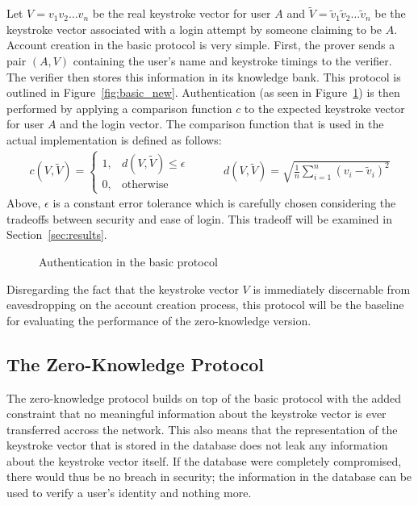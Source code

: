 \documentclass[11pt]{article}
\begin{document}
Let $V=v_1v_2\ldots v_n$ be the real keystroke vector for user $A$ and $\tilde V = \tilde v_1\tilde v_2\ldots\tilde v_n$ be the keystroke vector associated with a login attempt by someone claiming to be $A$. Account creation in the basic protocol is very simple. First, the prover sends a pair $(A,V)$ containing the user's name and keystroke timings to the verifier. The verifier then stores this information in its knowledge bank. This protocol is outlined in Figure~\ref{fig:basic_new}. Authentication (as seen in Figure~\ref{fig:basic_auth}) is then performed by applying a comparison function $c$ to the expected keystroke vector for user $A$ and the login vector. The comparison function that is used in the actual implementation is defined as follows:
$$\begin{array}{ccc}
c(V,\tilde V) = \begin{cases}
  1, & d(V, \tilde V) \le \epsilon \\
  0, & \text{otherwise}
\end{cases}
& \;\;\;\;\; &
d(V,\tilde V) = \sqrt{\frac1n\sum_{i=1}^n(v_i - \tilde v_i)^2}
\end{array}$$
Above, $\epsilon$ is a constant error tolerance which is carefully chosen considering the tradeoffs between security and ease of login. This tradeoff will be examined in Section~\ref{sec:results}.

\begin{figure}[h!]
\centering
{}
\caption{Authentication in the basic protocol}
\label{fig:basic_auth}
\end{figure}


Disregarding the fact that the keystroke vector $V$ is immediately discernable from eavesdropping on the account creation process, this protocol will be the baseline for evaluating the performance of the zero-knowledge version.

\subsection{The Zero-Knowledge Protocol}
\label{sec:zkp-prot}
The zero-knowledge protocol builds on top of the basic protocol with the added constraint that no meaningful information about the keystroke vector is ever transferred accross the network. This also means that the representation of the keystroke vector that is stored in the database does not leak any information about the keystroke vector itself. If the database were completely compromised, there would thus be no breach in security; the information in the database can be used to verify a user's identity and nothing more.
\end{document}
